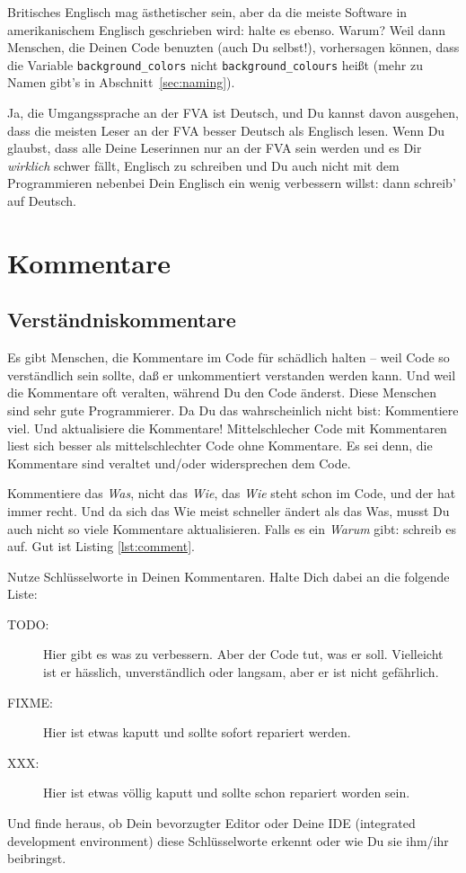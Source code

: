 \documentclass[twoside]{scrreprt}
\providecommand{\code}[1]{\texttt{#1}}
\begin{document}
 Britisches Englisch mag \"a{}sthetischer sein,
aber da die meiste Software in amerikanischem Englisch geschrieben wird: halte
es ebenso. Warum? Weil dann Menschen, die Deinen Code benuzten 
(auch Du selbst!), vorhersagen k\"o{}nnen, dass die Variable
\code{background\_colors} nicht \code{background\_colours} hei\ss{}t (mehr zu
Namen gibt's in Abschnitt~\ref{sec:naming}). 

 Ja, die Umgangssprache an der FVA ist Deutsch, und Du
kannst davon ausgehen, dass die meisten Leser an der FVA besser Deutsch als
Englisch lesen. Wenn Du glaubst, dass alle Deine Leserinnen nur an der FVA
sein werden und es Dir \emph{wirklich} schwer f\"a{}llt, Englisch zu schreiben
und Du auch nicht mit dem Programmieren nebenbei Dein Englisch ein wenig
verbessern willst: dann schreib' auf Deutsch.

\section{Kommentare}
\subsection{Verst\"a{}ndniskommentare\label{sec:compcom}}
Es gibt Menschen, die Kommentare im Code f\"u{}r sch\"a{}dlich halten -- weil 
Code so verst\"a{}ndlich sein sollte, da\ss{} er unkommentiert verstanden
werden kann.
Und weil die Kommentare oft veralten, w\"a{}hrend Du den Code \"a{}nderst.
Diese Menschen sind sehr gute Programmierer.
Da Du das wahrscheinlich nicht bist:
Kommentiere viel. Und aktualisiere die Kommentare! 
Mittelschlecher Code mit Kommentaren liest sich besser als mittelschlechter  
Code ohne Kommentare. Es sei denn, die Kommentare sind veraltet und/oder 
widersprechen dem Code.

Kommentiere das \emph{Was}, nicht das \emph{Wie}, das \emph{Wie} steht schon im 
Code, und der hat immer recht.
Und da sich das Wie meist schneller \"a{}ndert als das Was, musst Du auch
nicht so viele Kommentare aktualisieren.
Falls es ein \emph{Warum} gibt: schreib es auf. 
Gut ist  Listing \ref{lst:comment}.


Nutze Schl\"u{}sselworte in Deinen Kommentaren. Halte Dich dabei an die folgende
Liste:
\begin{description}
\item[TODO:] Hier gibt es was zu verbessern. Aber der Code tut, was er soll.
  Vielleicht ist er h\"a{}sslich, unverst\"a{}ndlich oder langsam,
  aber er ist nicht gef\"a{}hrlich.
\item[FIXME:] Hier ist etwas kaputt und sollte sofort repariert werden.
\item[XXX:] Hier ist etwas v\"o{}llig kaputt und sollte schon repariert
  worden sein.
\end{description}
Und finde heraus, ob Dein bevorzugter Editor oder Deine IDE (integrated
development environment) diese Schl\"u{}sselworte erkennt oder wie Du sie
ihm/ihr beibringst.
\end{document}
